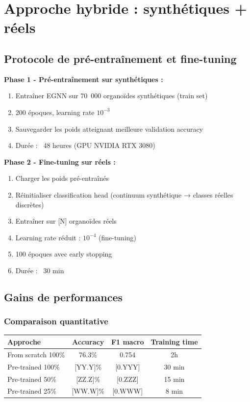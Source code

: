 \section{Approche hybride : synthétiques + réels}

\subsection{Protocole de pré-entraînement et fine-tuning}

\textbf{Phase 1 - Pré-entraînement sur synthétiques :}
\begin{enumerate}
    \item Entraîner EGNN sur 70~000 organoïdes synthétiques (train set)
    \item 200 époques, learning rate $10^{-3}$
    \item Sauvegarder les poids atteignant meilleure validation accuracy
    \item Durée : ~48 heures (GPU NVIDIA RTX 3080)
\end{enumerate}

\textbf{Phase 2 - Fine-tuning sur réels :}
\begin{enumerate}
    \item Charger les poids pré-entraînés
    \item Réinitialiser classification head (continuum synthétique → classes réelles discrètes)
    \item Entraîner sur [N] organoïdes réels
    \item Learning rate réduit : $10^{-4}$ (fine-tuning)
    \item 100 époques avec early stopping
    \item Durée : ~30 min
\end{enumerate}

\subsection{Gains de performances}

\subsubsection{Comparaison quantitative}

\begin{center}
\begin{tabular}{|l|c|c|c|}
\hline
\textbf{Approche} & \textbf{Accuracy} & \textbf{F1 macro} & \textbf{Training time} \\
\hline
From scratch 100\% & 76.3\% & 0.754 & 2h \\
Pre-trained 100\% & [YY.Y]\% & [0.YYY] & 30 min \\
Pre-trained 50\% & [ZZ.Z]\% & [0.ZZZ] & 15 min \\
Pre-trained 25\% & [WW.W]\% & [0.WWW] & 8 min \\
\hline
\end{tabular}
\end{center}

